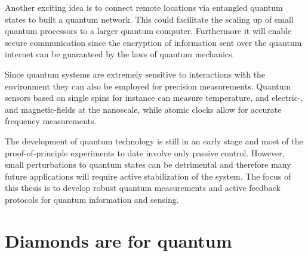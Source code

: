 Another exciting idea is to connect remote locations via entangled quantum states to built a quantum network. This could facilitate the scaling up of small quantum processors to a larger quantum computer. Furthermore it will enable secure communication since the encryption of information sent over the quantum internet can be guaranteed by the laws of quantum mechanics.

Since quantum systems are extremely sensitive to interactions with the environment they can also be employed for precision measurements. Quantum sensors based on single spins for instance can measure temperature, and electric-, and magnetic-fields at the nanoscale, while atomic clocks allow for accurate frequency measurements.

The development of quantum technology is still in an early stage and most of the proof-of-principle experiments to date involve only passive control. However, small perturbations to quantum states can be detrimental and therefore many future applications will require active stabilization of the system. The focus of this thesis is to develop robust quantum measurements and active feedback protocols for quantum information and sensing.

\section{Diamonds are for quantum}

\clearpage




